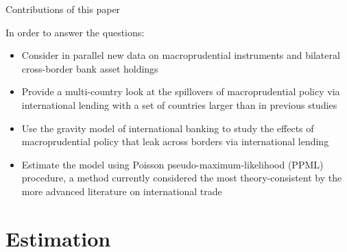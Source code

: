 \documentclass{beamer}
\begin{document}
\begin{frame}{Contributions of this paper}

\begin{block}{In order to answer the questions:}
\begin{itemize}
\item Consider in parallel new data on macroprudential instruments and bilateral cross-border bank asset holdings
\item Provide a multi-country look at the spillovers of macroprudential policy via international lending with a set of countries larger than in previous studies
\item Use the gravity model of international banking to study the effects of macroprudential policy that leak across borders via international lending 
\item Estimate the model using Poisson pseudo-maximum-likelihood (PPML) procedure, a method currently considered the most theory-consistent by the more advanced literature on international trade
\end{itemize}
\end{block}

\end{frame}

\section{Estimation}
\end{document}
